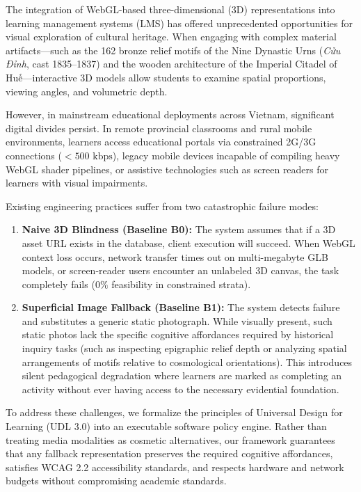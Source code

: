 \documentclass[11pt,a4paper]{article}
\begin{document}
The integration of WebGL-based three-dimensional (3D) representations into learning management systems (LMS) has offered unprecedented opportunities for visual exploration of cultural heritage. When engaging with complex material artifacts---such as the 162 bronze relief motifs of the Nine Dynastic Urns (\textit{Cửu Đỉnh}, cast 1835--1837) and the wooden architecture of the Imperial Citadel of Huế---interactive 3D models allow students to examine spatial proportions, viewing angles, and volumetric depth.

However, in mainstream educational deployments across Vietnam, significant digital divides persist. In remote provincial classrooms and rural mobile environments, learners access educational portals via constrained 2G/3G connections ($< 500\text{ kbps}$), legacy mobile devices incapable of compiling heavy WebGL shader pipelines, or assistive technologies such as screen readers for learners with visual impairments. 

Existing engineering practices suffer from two catastrophic failure modes:
\begin{enumerate}
    \item \textbf{Naive 3D Blindness (Baseline B0):} The system assumes that if a 3D asset URL exists in the database, client execution will succeed. When WebGL context loss occurs, network transfer times out on multi-megabyte GLB models, or screen-reader users encounter an unlabeled 3D canvas, the task completely fails ($0\%$ feasibility in constrained strata).
    \item \textbf{Superficial Image Fallback (Baseline B1):} The system detects failure and substitutes a generic static photograph. While visually present, such static photos lack the specific cognitive affordances required by historical inquiry tasks (such as inspecting epigraphic relief depth or analyzing spatial arrangements of motifs relative to cosmological orientations). This introduces silent pedagogical degradation where learners are marked as completing an activity without ever having access to the necessary evidential foundation.
\end{enumerate}

To address these challenges, we formalize the principles of Universal Design for Learning (UDL 3.0) into an executable software policy engine. Rather than treating media modalities as cosmetic alternatives, our framework guarantees that any fallback representation preserves the required cognitive affordances, satisfies WCAG 2.2 accessibility standards, and respects hardware and network budgets without compromising academic standards.
\end{document}
